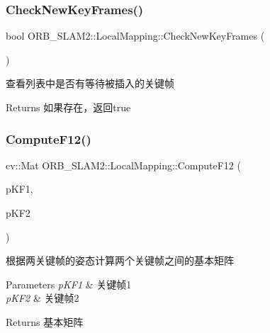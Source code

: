 \subsubsection{\texorpdfstring{Check\+New\+Key\+Frames()}{CheckNewKeyFrames()}}
{\footnotesize\ttfamily bool O\+R\+B\+\_\+\+S\+L\+A\+M2\+::\+Local\+Mapping\+::\+Check\+New\+Key\+Frames (\begin{DoxyParamCaption}{ }\end{DoxyParamCaption})\hspace{0.3cm}{\ttfamily [protected]}}



查看列表中是否有等待被插入的关键帧 

\begin{DoxyReturn}{Returns}
如果存在，返回true 
\end{DoxyReturn}
\mbox{\label{class_o_r_b___s_l_a_m2_1_1_local_mapping_ac72419089ac268253671b8da2ec12c21}} 
\subsubsection{\texorpdfstring{Compute\+F12()}{ComputeF12()}}
{\footnotesize\ttfamily cv\+::\+Mat O\+R\+B\+\_\+\+S\+L\+A\+M2\+::\+Local\+Mapping\+::\+Compute\+F12 (\begin{DoxyParamCaption}\item[{\mbox{\hyperlink{class_o_r_b___s_l_a_m2_1_1_key_frame}{Key\+Frame}} $\ast$\&}]{p\+K\+F1,  }\item[{\mbox{\hyperlink{class_o_r_b___s_l_a_m2_1_1_key_frame}{Key\+Frame}} $\ast$\&}]{p\+K\+F2 }\end{DoxyParamCaption})\hspace{0.3cm}{\ttfamily [protected]}}

根据两关键帧的姿态计算两个关键帧之间的基本矩阵 
\begin{DoxyParams}{Parameters}
{\em p\+K\+F1} & 关键帧1 \\
\hline
{\em p\+K\+F2} & 关键帧2 \\
\hline
\end{DoxyParams}
\begin{DoxyReturn}{Returns}
基本矩阵 
\end{DoxyReturn}
\mbox{\label{class_o_r_b___s_l_a_m2_1_1_local_mapping_ac06b513357429d9eff89e29d2ae58d6c}} 
